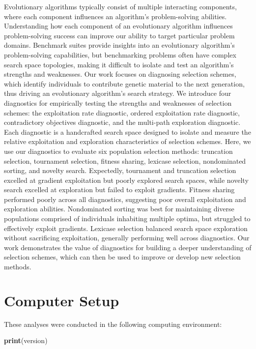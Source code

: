 \documentclass[]{book}
\newenvironment{Shaded}{\begin{snugshade}}{\end{snugshade}}
\newcommand{\KeywordTok}[1]{\textcolor[rgb]{0.13,0.29,0.53}{\textbf{#1}}}
\newcommand{\NormalTok}[1]{#1}
\begin{document}
Evolutionary algorithms typically consist of multiple interacting components, where each component influences an algorithm's problem-solving abilities.
Understanding how each component of an evolutionary algorithm influences problem-solving success can improve our ability to target particular problem domains.
Benchmark suites provide insights into an evolutionary algorithm's problem-solving capabilities, but benchmarking problems often have complex search space topologies, making it difficult to isolate and test an algorithm's strengths and weaknesses.
Our work focuses on diagnosing selection schemes, which identify individuals to contribute genetic material to the next generation, thus driving an evolutionary algorithm's search strategy.
We introduce four diagnostics for empirically testing the strengths and weaknesses of selection schemes: the exploitation rate diagnostic, ordered exploitation rate diagnostic, contradictory objectives diagnostic, and the multi-path exploration diagnostic.
Each diagnostic is a handcrafted search space designed to isolate and measure the relative exploitation and exploration characteristics of selection schemes.
Here, we use our diagnostics to evaluate six population selection methods: truncation selection, tournament selection, fitness sharing, lexicase selection, nondominated sorting, and novelty search.
Expectedly, tournament and truncation selection excelled at gradient exploitation but poorly explored search spaces, while novelty search excelled at exploration but failed to exploit gradients.
Fitness sharing performed poorly across all diagnostics, suggesting poor overall exploitation and exploration abilities.
Nondominated sorting was best for maintaining diverse populations comprised of individuals inhabiting multiple optima, but struggled to effectively exploit gradients.
Lexicase selection balanced search space exploration without sacrificing exploitation, generally performing well across diagnostics.
Our work demonstrates the value of diagnostics for building a deeper understanding of selection schemes, which can then be used to improve or develop new selection methods.

\hypertarget{computer-setup}{%
\section{Computer Setup}\label{computer-setup}}

These analyses were conducted in the following computing environment:

\begin{Shaded}
\begin{Highlighting}[]
\KeywordTok{print}\NormalTok{(version)}
\end{Highlighting}
\end{Shaded}
\end{document}
